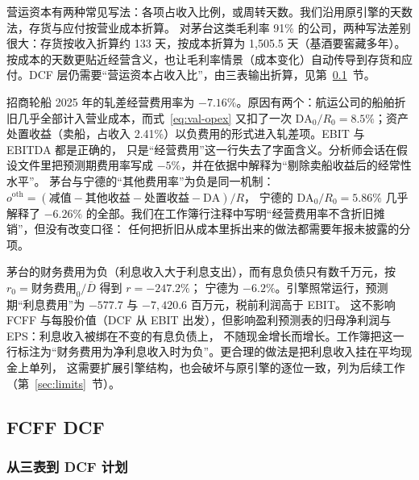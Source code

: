 \begin{tradeoff}[：周转天数法而非占收入比]
营运资本有两种常见写法：各项占收入比例，或周转天数。我们沿用原引擎的天数法，存货与应付按营业成本折算。
对茅台这类毛利率 91\% 的公司，两种写法差别很大：存货按收入折算约 133 天，按成本折算为 1,505.5 天（基酒要窖藏多年）。
按成本的天数更贴近经营含义，也让毛利率情景（成本变化）自动传导到存货和应付。DCF 层仍需要“营运资本占收入比”，由三表输出折算，见第~\ref{sec:val-dcf}~节。
\end{tradeoff}

\begin{failcase}
招商轮船 2025 年的轧差经营费用率为 $-7.16\%$。原因有两个：航运公司的船舶折旧几乎全部计入营业成本，而式~\eqref{eq:val-opex} 又扣了一次
$\text{DA}_0/R_0=8.5\%$；资产处置收益（卖船，占收入 2.41\%）以负费用的形式进入轧差项。EBIT 与 EBITDA 都是正确的，
只是“经营费用”这一行失去了字面含义。分析师会话在假设文件里把预测期费用率写成 $-5\%$，并在依据中解释为“剔除卖船收益后的经常性水平”。
茅台与宁德的“其他费用率”为负是同一机制：$o^{\text{oth}}=(\text{减值}-\text{其他收益}-\text{处置收益}-\text{DA})/R$，
宁德的 $\text{DA}_0/R_0=5.86\%$ 几乎解释了 $-6.26\%$ 的全部。我们在工作簿行注释中写明“经营费用率不含折旧摊销”，但没有改变口径：
任何把折旧从成本里拆出来的做法都需要年报未披露的分项。
\end{failcase}

\begin{failcase}[ 2：负利率]
茅台的财务费用为负（利息收入大于利息支出），而有息负债只有数千万元，按 $r_0=\text{财务费用}_0/\overline{D}$ 得到 $r=-247.2\%$；
宁德为 $-6.2\%$。引擎照常运行，预测期“利息费用”为 $-577.7$ 与 $-7{,}420.6$ 百万元，税前利润高于 EBIT。
这不影响 FCFF 与每股价值（DCF 从 EBIT 出发），但影响盈利预测表的归母净利润与 EPS：利息收入被绑在不变的有息负债上，
不随现金增长而增长。工作簿把这一行标注为“财务费用为净利息收入时为负”。更合理的做法是把利息收入挂在平均现金上单列，
这需要扩展引擎结构，也会破坏与原引擎的逐位一致，列为后续工作（第~\ref{sec:limits}~节）。
\end{failcase}

\subsection{FCFF DCF}
\label{sec:val-dcf}

\subsubsection{从三表到 DCF 计划}

